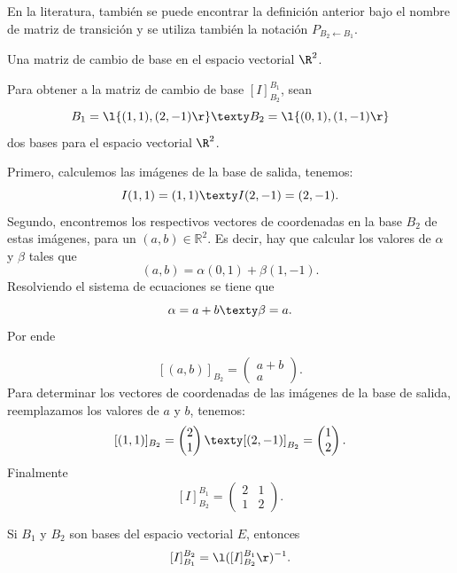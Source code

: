 \documentclass[compacto,10pt]{pubciencias-notas}
\begin{document}

\begin{advertencia}
En la literatura, también se puede encontrar la definición anterior bajo el nombre de matriz de transición y se utiliza también la notación $ P_{B_{2}\gets B_{1}}$.
\end{advertencia}

\begin{ejem}
Una matriz de cambio de base en el espacio vectorial $\R^2$.

\noindent Para obtener a la matriz de cambio de base $[I]^{B_{1}}_{B_{2}}$, sean 
\[
    B_{1} = \l\{(1,1),(2,-1)\r\}
    \texty
    B_{2} = \l\{(0,1),(1,-1)\r\}
\]
dos bases para el espacio vectorial $\R^2$.

\noindent Primero, calculemos las imágenes de la base de salida, tenemos:
\[
    I(1,1)=(1,1) \texty I(2,-1)=(2,-1).
\]
\noindent Segundo, encontremos los respectivos vectores de coordenadas en la base $B_{2}$ de estas imágenes, para un $(a,b)\in \mathbb{R}^2$. Es decir, hay que calcular los valores de $\alpha$ y $\beta$ tales que
\[
    (a,b) = \alpha (0,1) + \beta (1,-1).
\]
Resolviendo el sistema de ecuaciones se tiene que
\[
    \alpha = a + b \texty \beta = a.
\]
Por ende

\[
    [(a,b)]_{B_{2}} =
    \begin{pmatrix}
        a + b \\
        a
    \end{pmatrix}.
\]
Para determinar los vectores de coordenadas de las imágenes de la base de salida, reemplazamos los valores de $a$ y $b$, tenemos:
\[
    [(1,1)]_{B_{2}} =
    \begin{pmatrix}
        2 \\
        1
    \end{pmatrix}
    \texty
    [(2,-1)]_{B_{2}} =
    \begin{pmatrix}
        1 \\
        2
    \end{pmatrix}.
\]
Finalmente
\[
    [I]^{B_{1}}_{B_{2}} = \begin{pmatrix}2&1\\1&2\end{pmatrix}.
\]
\end{ejem}



\begin{teo}
    Si $B_{1}$ y $B_{2}$ son bases del espacio vectorial $E$, entonces
    \[
         [I]^{B_{2}}_{B_{1}} = \l([I]^{B_{1}}_{B_{2}}\r)^{-1}.
    \]
\end{teo}
\end{document}
